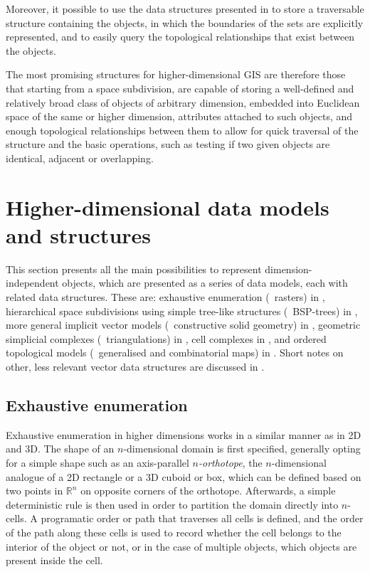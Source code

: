 Moreover, it possible to use the data structures presented in  to store a traversable structure containing the objects, in which the boundaries of the sets are explicitly represented, and to easily query the topological relationships that exist between the objects.

The most promising structures for higher-dimensional GIS are therefore those that starting from a space subdivision, are capable of storing a well-defined and relatively broad class of objects of arbitrary dimension, embedded into Euclidean space of the same or higher dimension, attributes attached to such objects, and enough topological relationships between them to allow for quick traversal of the structure and the basic operations, such as testing if two given objects are identical, adjacent or overlapping.

\section{Higher-dimensional data models and structures}
\label{se:data-structures}

This section presents all the main possibilities to represent dimension-independent objects, which are presented as a series of data models, each with related data structures.
These are: exhaustive enumeration (\eg\ rasters) in , hierarchical space subdivisions using simple tree-like structures (\eg\ BSP-trees) in , more general implicit vector models (\eg\ constructive solid geometry) in , geometric simplicial complexes (\eg\ triangulations) in , cell complexes in , and ordered topological models (\eg\ generalised and combinatorial maps) in .
Short notes on other, less relevant vector data structures are discussed in .

\subsection{Exhaustive enumeration}
\label{ss:regular-partitions}

Exhaustive enumeration in higher dimensions works in a similar manner as in 2D and 3D.
The shape of an $n$-dimensional domain is first specified, generally opting for a simple shape such as an axis-parallel \emph{$n$-orthotope}, the $n$-dimensional analogue of a 2D rectangle or a 3D cuboid or box, which can be defined based on two points in $\mathbb{R}^n$ on opposite corners of the orthotope.
Afterwards, a simple deterministic rule is then used in order to partition the domain directly into $n$-cells.
A programatic order or path that traverses all cells is defined, and the order of the path along these cells is used to record whether the cell belongs to the interior of the object or not, or in the case of multiple objects, which objects are present inside the cell.


